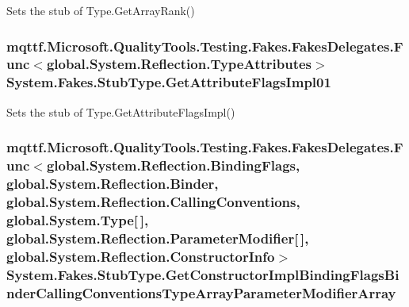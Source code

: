 Sets the stub of Type.\-Get\-Array\-Rank()

\hypertarget{class_system_1_1_fakes_1_1_stub_type_afdb0f5ae2c671e516805ec7fbc27e91b}{
\subsubsection[{Get\-Attribute\-Flags\-Impl01}]{\setlength{\rightskip}{0pt plus 5cm}mqttf.\-Microsoft.\-Quality\-Tools.\-Testing.\-Fakes.\-Fakes\-Delegates.\-Func$<$global.\-System.\-Reflection.\-Type\-Attributes$>$ System.\-Fakes.\-Stub\-Type.\-Get\-Attribute\-Flags\-Impl01}}\label{class_system_1_1_fakes_1_1_stub_type_afdb0f5ae2c671e516805ec7fbc27e91b}


Sets the stub of Type.\-Get\-Attribute\-Flags\-Impl()

\hypertarget{class_system_1_1_fakes_1_1_stub_type_a0e24bb569adc9f98d1711622886d3254}{
\subsubsection[{Get\-Constructor\-Impl\-Binding\-Flags\-Binder\-Calling\-Conventions\-Type\-Array\-Parameter\-Modifier\-Array}]{\setlength{\rightskip}{0pt plus 5cm}mqttf.\-Microsoft.\-Quality\-Tools.\-Testing.\-Fakes.\-Fakes\-Delegates.\-Func$<$global.\-System.\-Reflection.\-Binding\-Flags, global.\-System.\-Reflection.\-Binder, global.\-System.\-Reflection.\-Calling\-Conventions, global.\-System.\-Type\mbox{[}$\,$\mbox{]}, global.\-System.\-Reflection.\-Parameter\-Modifier\mbox{[}$\,$\mbox{]}, global.\-System.\-Reflection.\-Constructor\-Info$>$ System.\-Fakes.\-Stub\-Type.\-Get\-Constructor\-Impl\-Binding\-Flags\-Binder\-Calling\-Conventions\-Type\-Array\-Parameter\-Modifier\-Array}}\label{class_system_1_1_fakes_1_1_stub_type_a0e24bb569adc9f98d1711622886d3254}


